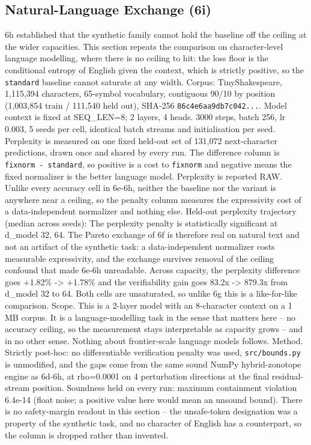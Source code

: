 \documentclass[10pt,journal]{IEEEtran}
\begin{document}
\subsection{Natural-Language Exchange (6i)}
6h established that the synthetic family cannot hold the baseline off the ceiling at the wider capacities. This section repeats the comparison on character-level language modelling, where there is no ceiling to hit: the loss floor is the conditional entropy of English given the context, which is strictly positive, so the \texttt{standard} baseline cannot saturate at any width.
Corpus: TinyShakespeare, 1,115,394 characters, 65-symbol vocabulary, contiguous 90/10 by position (1,003,854 train / 111,540 held out), SHA-256 \texttt{86c4e6aa9db7c042...}. Model context is fixed at SEQ\_LEN=8; 2 layers, 4 heads. 3000 steps, batch 256, lr 0.003, 5 seeds per cell, identical batch streams and initialisation per seed. Perplexity is measured on one fixed held-out set of 131,072 next-character predictions, drawn once and shared by every run.
The difference column is \texttt{fixnorm - standard}, so positive is a cost to \texttt{fixnorm} and negative means the fixed normalizer is the better language model.
Perplexity is reported RAW. Unlike every accuracy cell in 6e-6h, neither the baseline nor the variant is anywhere near a ceiling, so the penalty column measures the expressivity cost of a data-independent normalizer and nothing else.
Held-out perplexity trajectory (median across seeds):
The perplexity penalty is statistically significant at d\_model 32, 64. The Pareto exchange of 6f is therefore real on natural text and not an artifact of the synthetic task: a data-independent normalizer costs measurable expressivity, and the exchange survives removal of the ceiling confound that made 6e-6h unreadable.
Across capacity, the perplexity difference goes +1.82\% -> +1.78\% and the verifiability gain goes 83.2x -> 879.3x from d\_model 32 to 64. Both cells are unsaturated, so unlike 6g this is a like-for-like comparison.
Scope. This is a 2-layer model with an 8-character context on a 1 MB corpus. It is a language-modelling task in the sense that matters here -- no accuracy ceiling, so the measurement stays interpretable as capacity grows -- and in no other sense. Nothing about frontier-scale language models follows.
Method. Strictly post-hoc: no differentiable verification penalty was used, \texttt{src/bounds.py} is unmodified, and the gaps come from the same sound NumPy hybrid-zonotope engine as 6d-6h, at rho=0.0001 on 4 perturbation directions at the final residual-stream position. Soundness held on every run: maximum containment violation 6.4e-14 (float noise; a positive value here would mean an unsound bound). There is no safety-margin readout in this section -- the unsafe-token designation was a property of the synthetic task, and no character of English has a counterpart, so the column is dropped rather than invented.
\end{document}
